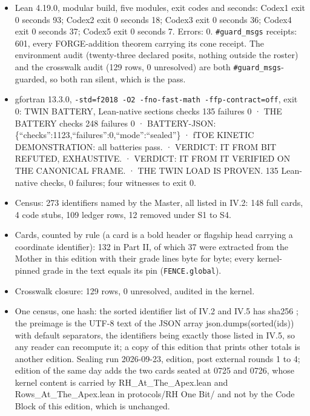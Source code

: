 \documentclass[10pt,twocolumn]{article}
\providecommand{\tightlist}{\setlength{\itemsep}{0pt}\setlength{\parskip}{0pt}}
\begin{document}
\begin{itemize}
\tightlist
\item
  Lean 4.19.0, modular build, five modules, exit codes and seconds:
  Codex1 exit 0 seconds 93; Codex2 exit 0 seconds 18; Codex3 exit 0
  seconds 36; Codex4 exit 0 seconds 37; Codex5 exit 0 seconds 7. Errors:
  0. \texttt{\#guard\_msgs} receipts: 601, every FORGE-addition theorem
  carrying its cone receipt. The environment audit (twenty-three
  declared posits, nothing outside the roster) and the crosswalk audit
  (129 rows, 0 unresolved) are both \texttt{\#guard\_msgs}-guarded, so
  both ran silent, which is the pass.
\item
  gfortran 13.3.0,
  \texttt{-std=f2018\ -O2\ -fno-fast-math\ -ffp-contract=off}, exit 0:
  TWIN BATTERY, Lean-native sections checks 135 failures 0 · THE BATTERY
  checks 248 failures 0 · BATTERY-JSON:
  \{``checks'':1123,``failures'':0,``mode'':``sealed''\} · fTOE KINETIC
  DEMONSTRATION: all batteries pass. · VERDICT: IT FROM BIT REFUTED,
  EXHAUSTIVE. · VERDICT: IT FROM IT VERIFIED ON THE CANONICAL FRAME. ·
  THE TWIN LOAD IS PROVEN. 135 Lean-native checks, 0 failures; four
  witnesses to exit 0.
\item
  Census: 273 identifiers named by the Master, all listed in IV.2: 148
  full cards, 4 code stubs, 109 ledger rows, 12 removed under S1 to S4.
\item
  Cards, counted by rule (a card is a bold header or flagship head
  carrying a coordinate identifier): 132 in Part II, of which 37 were
  extracted from the Mother in this edition with their grade lines byte
  for byte; every kernel-pinned grade in the text equals its pin
  (\texttt{FENCE.global}).
\item
  Crosswalk closure: 129 rows, 0 unresolved, audited in the kernel.
\item
  One census, one hash: the sorted identifier list of IV.2 and IV.5 has
  sha256
  \texttt{};
  the preimage is the UTF-8 text of the JSON array
  json.dumps(sorted(ids)) with default separators, the identifiers being
  exactly those listed in IV.5, so any reader can recompute it; a copy
  of this edition that prints other totals is another edition. Sealing
  run 2026-09-23, edition, post external rounds 1 to 4; edition of the
  same day adds the two cards seated at 0725 and 0726, whose kernel
  content is carried by RH\_At\_The\_Apex.lean and
  Rows\_At\_The\_Apex.lean in protocols/RH One Bit/ and not by the Code
  Block of this edition, which is unchanged.
\end{itemize}
\end{document}
